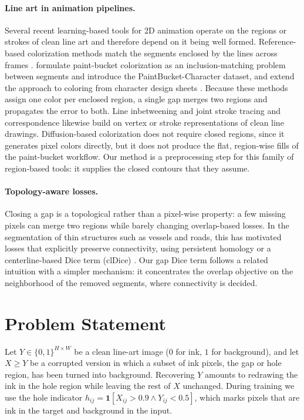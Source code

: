 \documentclass[11pt]{article}
\begin{document}
\paragraph{Line art in animation pipelines.} 
Several recent learning-based tools for 2D animation operate on the regions or
strokes of clean line art and therefore depend on it being well formed.
Reference-based colorization methods match the segments enclosed by the lines
across frames \citep{casey2021animation}. \citet{dai2024inclusion} formulate
paint-bucket colorization as an inclusion-matching problem between segments and
introduce the PaintBucket-Character dataset, and extend the approach to coloring
from character design sheets \citep{dai2024designsheets}. Because these methods
assign one color per enclosed region, a single gap merges two regions and propagates
the error to both. Line inbetweening \citep{siyao2023inbetween} and joint stroke
tracing and correspondence \citep{mo2024jostc} likewise build on vertex or stroke
representations of clean line drawings. Diffusion-based colorization
\citep{liu2025manganinja} does not require closed regions, since it generates
pixel colors directly, but it does not produce the flat, region-wise fills of the
paint-bucket workflow. Our method is a preprocessing step for this family of
region-based tools: it supplies the closed contours that they assume.

\paragraph{Topology-aware losses.}
Closing a gap is a topological rather than a pixel-wise property: a few missing
pixels can merge two regions while barely changing overlap-based losses. In the
segmentation of thin structures such as vessels and roads, this has motivated
losses that explicitly preserve connectivity, using persistent homology
\citep{hu2019topology} or a centerline-based Dice term (clDice)
\citep{shit2021cldice}. Our gap Dice term follows a related intuition with a
simpler mechanism: it concentrates the overlap objective on the neighborhood of the
removed segments, where connectivity is decided.

\section{Problem Statement}  
\label{sec:problem}

Let $Y \in \{0,1\}^{H \times W}$ be a clean line-art image ($0$ for ink, $1$ for
background), and let $X \ge Y$ be a corrupted version in which a subset of ink
pixels, the gap or hole region, has been turned into background. Recovering $Y$
amounts to redrawing the ink in the hole region while leaving the rest of $X$ unchanged. During training we use the hole indicator $h_{ij} = \mathbf{1}[X_{ij} > 0.9 \wedge Y_{ij} < 0.5]$, which marks pixels that are ink in the target and background in the input.
\end{document}
